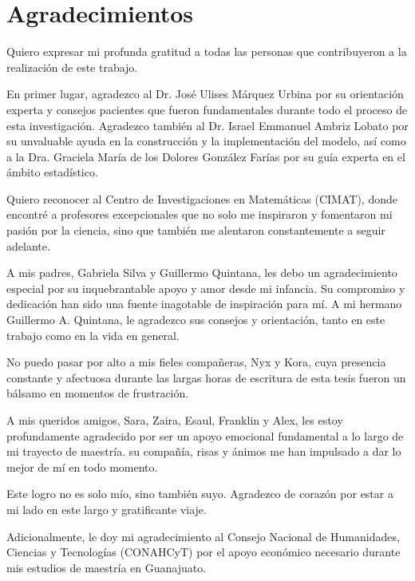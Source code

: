 \chapter*{Agradecimientos}

Quiero expresar mi profunda gratitud a todas las personas que contribuyeron a la realización de este trabajo.

En primer lugar, agradezco al Dr. José Ulises Márquez Urbina por su orientación experta y consejos pacientes que fueron fundamentales durante todo el proceso de esta investigación. Agradezco también al Dr. Israel Emmanuel Ambriz Lobato por su unvaluable ayuda en la construcción y la implementación del modelo, así como a la Dra. Graciela María de los Dolores González Farías por su guía experta en el ámbito estadístico.

Quiero reconocer al Centro de Investigaciones en Matemáticas (CIMAT), donde encontré a profesores excepcionales que no solo me inspiraron y fomentaron mi pasión por la ciencia, sino que también me alentaron constantemente a seguir adelante.

A mis padres, Gabriela Silva y Guillermo Quintana, les debo un agradecimiento especial por su inquebrantable apoyo y amor desde mi infancia. Su compromiso y dedicación han sido una fuente inagotable de inspiración para mí. A mi hermano Guillermo A. Quintana, le agradezco sus consejos y orientación, tanto en este trabajo como en la vida en general.

No puedo pasar por alto a mis fieles compañeras, Nyx y Kora, cuya presencia constante y afectuosa durante las largas horas de escritura de esta tesis fueron un bálsamo en momentos de frustración.

A mis queridos amigos, Sara, Zaira, Esaul, Franklin y Alex, les estoy profundamente agradecido por ser un apoyo emocional fundamental a lo largo de mi trayecto de maestría. su compañía, risas y ánimos me han impulsado a dar lo mejor de mí en todo momento.

Este logro no es solo mío, sino también suyo. Agradezco de corazón por estar a mi lado en este largo y gratificante viaje.

Adicionalmente, le doy mi agradecimiento al Consejo Nacional de Humanidades, Ciencias y Tecnologías (CONAHCyT) por el apoyo económico necesario durante mis estudios de maestría en Guanajuato.
